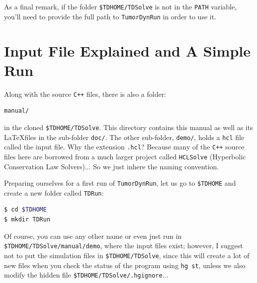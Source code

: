 \documentclass{amsproc}
\theoremstyle{definition}
\theoremstyle{remark}
\numberwithin{equation}{section}
\numberwithin{figure}{section}
\begin{document}
As a final remark, if the folder \texttt{\$TDHOME/TDSolve} is not in the \texttt{PATH} variable, you'll need to provide the full path to \texttt{TumorDynRun} in order to use it.

\section{Input File Explained and A Simple Run}
Along with the source \texttt{C++} files, there is also a folder:
\begin{lstlisting}[backgroundcolor = \color{lightgray}, language = bash, xleftmargin = 0.1cm, framexleftmargin = 0.1cm]
manual/
\end{lstlisting}
in the cloned \texttt{\$TDHOME/TDSolve}.
This directory contains this manual as well as its \LaTeX files in the sub-folder \texttt{doc/}.
The other sub-folder, \texttt{demo/}, holds a \texttt{hcl} file called the input file.
Why the extension \texttt{.hcl}? Because many of the \texttt{C++} source files here are borrowed from a much larger project called \texttt{HCLSolve} (Hyperbolic Conservation Law Solvers)... So we just inhere the naming convention.

Preparing ourselves for a first run of \texttt{TumorDynRun}, let us go to \texttt{\$TDHOME} and create a new folder called \texttt{TDRun}:
\begin{lstlisting}[backgroundcolor = \color{lightgray}, language = bash, xleftmargin = 0.1cm, framexleftmargin = 0.0cm]
$ cd $TDHOME
$ mkdir TDRun
\end{lstlisting}
Of course, you can use any other name or even just run in \texttt{\$TDHOME/TDSolve/manual/demo}, where the input files exist;
however, I suggest not to put the simulation files in \texttt{\$TDHOME/TDSolve}, since this will create a lot of new files when you check the status of the program using \texttt{hg st}, unless we also modify the hidden file \texttt{\$TDHOME/TDSolve/.hgignore}...
\end{document}
